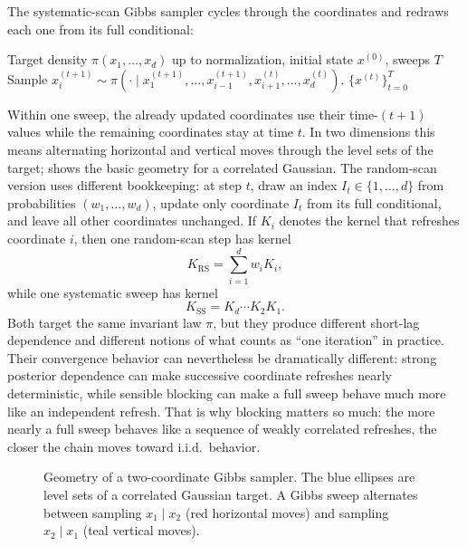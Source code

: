 The systematic-scan Gibbs sampler cycles through the coordinates and redraws each one from its full conditional:
\begin{algorithm}[t]
  \caption{Systematic-scan Gibbs sampler}
  \label{alg:gibbs}
  \begin{algorithmic}[1]
    \Require Target density $\pi(x_1,\dots,x_d)$ up to normalization, initial state $x^{(0)}$, sweeps $T$
        \State Sample $x^{(t+1)}_i \sim \pi(\cdot \mid x^{(t+1)}_1,\dots,x^{(t+1)}_{i-1},x^{(t)}_{i+1},\dots,x^{(t)}_d)$.
      \EndFor
    \EndFor
    \State \Return $\{x^{(t)}\}_{t=0}^T$
  \end{algorithmic}
\end{algorithm}
Within one sweep, the already updated coordinates use their time-$(t+1)$ values while the remaining coordinates stay at time $t$.
In two dimensions this means alternating horizontal and vertical moves through the level sets of the target;  shows the basic geometry for a correlated Gaussian.
The random-scan version uses different bookkeeping: at step $t$, draw an index $I_t\in\{1,\dots,d\}$ from probabilities $(w_1,\dots,w_d)$, update only coordinate $I_t$ from its full conditional, and leave all other coordinates unchanged.
If $K_i$ denotes the kernel that refreshes coordinate $i$, then one random-scan step has kernel
\[
  K_{\mathrm{RS}} = \sum_{i=1}^d w_i K_i,
\]
while one systematic sweep has kernel
\[
  K_{\mathrm{SS}} = K_d \cdots K_2 K_1.
\]
Both target the same invariant law $\pi$, but they produce different short-lag dependence and different notions of what counts as ``one iteration'' in practice.
Their convergence behavior can nevertheless be dramatically different: strong posterior dependence can make successive coordinate refreshes nearly deterministic, while sensible blocking can make a full sweep behave much more like an independent refresh.
That is why blocking matters so much:
the more nearly a full sweep behaves like a sequence of weakly correlated refreshes, the closer the chain moves toward i.i.d.\ behavior.

\begin{figure}[t]
  \centering
  
  \caption{Geometry of a two-coordinate Gibbs sampler.
  The blue ellipses are level sets of a correlated Gaussian target.
  A Gibbs sweep alternates between sampling $x_1\mid x_2$ (red horizontal moves) and sampling $x_2\mid x_1$ (teal vertical moves).}
  \label{fig:gibbs-2d-geometry}
\end{figure}

